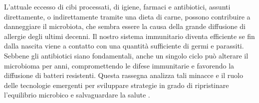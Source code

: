 \documentclass[12pt]{book} %
\begin{document}
L'attuale eccesso di cibi processati, di igiene, farmaci e antibiotici, assunti direttamente, o indirettamente tramite una dieta di carne, possono contribuire a danneggiare il microbiota, che sembra essere la causa della grande diffusione di allergie degli ultimi decenni. Il nostro sistema immunitario diventa efficiente se fin dalla nascita viene a contatto con una quantità sufficiente di germi e parassiti. Sebbene gli antibiotici siano fondamentali, anche un singolo ciclo può alterare il microbioma per anni, compromettendo le difese immunitarie e favorendo la diffusione di batteri resistenti. Questa rassegna analizza tali minacce e il ruolo delle tecnologie emergenti per sviluppare strategie in grado di ripristinare l'equilibrio microbico e salvaguardare la salute .


\end{document}
